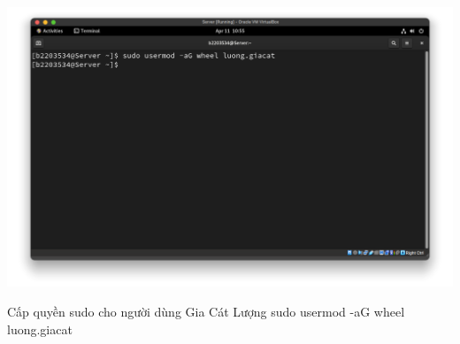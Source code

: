 \begin{minipage}{.93\linewidth}
  \captionsetup{type=figure, skip=-15pt}
  \includegraphics[width=\linewidth]{./imgs/Hinh-16.png}
  \caption{\bfseries Cấp quyền sudo cho người dùng Gia Cát Lượng}
  \label{fig:groupadd-wheel}
\end{minipage}

\vspace{0.5cm}
\begin{bashlisting}{Cấp quyền sudo cho người dùng Gia Cát Lượng}
  sudo usermod -aG wheel luong.giacat
\end{bashlisting}
